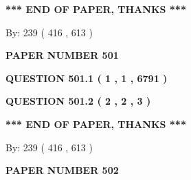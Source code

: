 \documentclass[12pt]{article}
\begin{document}
   
   
   
   
\vspace{1.0in} 
{\textbf{\large{ *** END OF PAPER, THANKS *** }}} 
   
   
\hspace{1.0in} By: 
 239 ( 416 ,  613 )
   
   
   
   
\newpage 
\setcounter{page}{ 
   501001 } 
   
   
   
   
 {\textbf{ \Large{ PAPER NUMBER  501  }}}
   
   
\vspace{0.2in}
   
   
   
   
   
   
 \vspace{0.2in}
 
 
 
 
   
   
  
\vspace{0.2in}
  
{\textbf{\Large{QUESTION
501.1 
 ( 1 , 1 , 6791 )
}}}
  
  
  
\vspace{0.2in}
  
{\textbf{\Large{QUESTION
501.2 
 ( 2 , 2 , 3 )
}}}
  
  
   
   
 \vspace{0.2in}
 
   
   
   
   
\vspace{1.0in} 
{\textbf{\large{ *** END OF PAPER, THANKS *** }}} 
   
   
\hspace{1.0in} By: 
 239 ( 416 ,  613 )
   
   
   
   
\newpage 
\setcounter{page}{ 
   502001 } 
   
   
   
   
 {\textbf{ \Large{ PAPER NUMBER  502  }}}
   
   
\vspace{0.2in}
   
\end{document}

